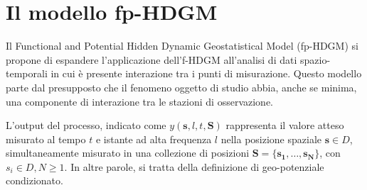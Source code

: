 \section[Il modello fp-HDGM]{Il modello fp-HDGM}
Il Functional and Potential Hidden Dynamic Geostatistical Model (fp-HDGM) si propone di espandere l'applicazione dell'f-HDGM all'analisi di dati spazio-temporali in cui è presente interazione tra i punti di misurazione. Questo modello parte dal presupposto che il fenomeno oggetto di studio abbia, anche se minima, una componente di interazione tra le stazioni di osservazione.
\par L'output del processo, indicato come $y(\mathbf{s}, l, t,\mathbf{S})$ rappresenta il valore atteso misurato al tempo $t$ e istante ad alta frequenza $l$ nella posizione spaziale $\mathbf{s} \in D$, simultaneamente misurato in una collezione di posizioni $\mathbf{S} = \{\mathbf{s_1}, \ldots, \mathbf{s_N}\}$,  con $s_i \in D, N \geq 1$. In altre parole, si tratta della definizione di geo-potenziale condizionato.

